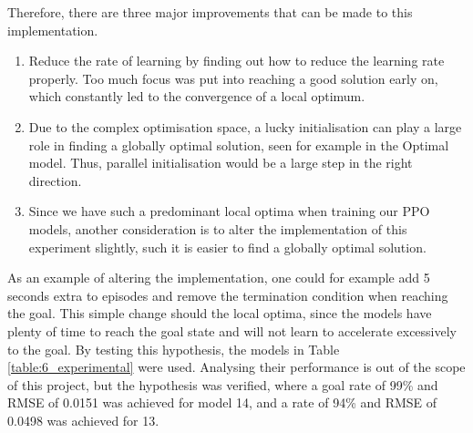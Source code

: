Therefore, there are three major improvements that can be made to this implementation. 
\begin{enumerate}
    \item Reduce the rate of learning by finding out how to reduce the learning rate properly. Too much focus was put into reaching a good solution early on, which constantly led to the convergence of a local optimum.
    \item Due to the complex optimisation space, a lucky initialisation can play a large role in finding a globally optimal solution, seen for example in the Optimal model. Thus, parallel initialisation would be a large step in the right direction.
    \item Since we have such a predominant local optima when training our PPO models, another consideration is to alter the implementation of this experiment slightly, such it is easier to find a globally optimal solution.
\end{enumerate}
As an example of altering the implementation, one could for example add 5 seconds extra to episodes and remove the termination condition when reaching the goal. This simple change should the local optima, since the models have plenty of time to reach the goal state and will not learn to accelerate excessively to the goal. 
By testing this hypothesis, the models in Table \ref{table:6_experimental} were used. Analysing their performance is out of the scope of this project, but the hypothesis was verified, where a goal rate of 99\% and RMSE of 0.0151 was achieved for model 14, and a rate of 94\% and RMSE of 0.0498 was achieved for 13.
\begin{table}[hbt]
    \centering
    \caption{Experimental models with extra Time and no reward limit when reaching goal.}
    \label{table:6_experimental}
\end{table}

